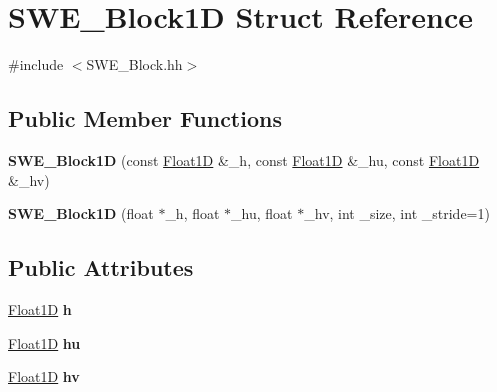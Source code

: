 \hypertarget{structSWE__Block1D}{\section{S\-W\-E\-\_\-\-Block1\-D Struct Reference}
\label{structSWE__Block1D}
}


{\ttfamily \#include $<$S\-W\-E\-\_\-\-Block.\-hh$>$}

\subsection*{Public Member Functions}
\begin{DoxyCompactItemize}
\item 
\hypertarget{structSWE__Block1D_a29516674bf63c42f9fd99995c09f4d55}{{\bfseries S\-W\-E\-\_\-\-Block1\-D} (const \hyperlink{classFloat1D}{Float1\-D} \&\-\_\-h, const \hyperlink{classFloat1D}{Float1\-D} \&\-\_\-hu, const \hyperlink{classFloat1D}{Float1\-D} \&\-\_\-hv)}\label{structSWE__Block1D_a29516674bf63c42f9fd99995c09f4d55}

\item 
\hypertarget{structSWE__Block1D_a9b23e09458246ba4212a1fbfc52206cc}{{\bfseries S\-W\-E\-\_\-\-Block1\-D} (float $\ast$\-\_\-h, float $\ast$\-\_\-hu, float $\ast$\-\_\-hv, int \-\_\-size, int \-\_\-stride=1)}\label{structSWE__Block1D_a9b23e09458246ba4212a1fbfc52206cc}

\end{DoxyCompactItemize}
\subsection*{Public Attributes}
\begin{DoxyCompactItemize}
\item 
\hypertarget{structSWE__Block1D_a7bea1da024ec63e77753fe32880fc5d2}{\hyperlink{classFloat1D}{Float1\-D} {\bfseries h}}\label{structSWE__Block1D_a7bea1da024ec63e77753fe32880fc5d2}

\item 
\hypertarget{structSWE__Block1D_a8662233fe9b86ead9ef2a419103271e5}{\hyperlink{classFloat1D}{Float1\-D} {\bfseries hu}}\label{structSWE__Block1D_a8662233fe9b86ead9ef2a419103271e5}

\item 
\hypertarget{structSWE__Block1D_aa261d9fcdb400d7da349f41dfa6d5b4f}{\hyperlink{classFloat1D}{Float1\-D} {\bfseries hv}}\label{structSWE__Block1D_aa261d9fcdb400d7da349f41dfa6d5b4f}

\end{DoxyCompactItemize}


